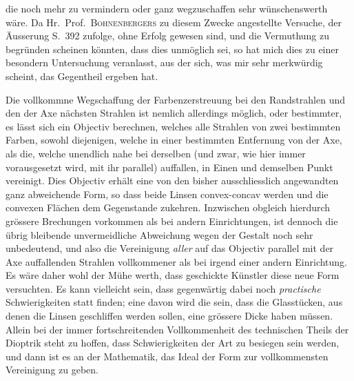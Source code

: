 die noch mehr zu vermindern oder ganz wegzuschaffen sehr wünschenswerth wäre. Da Hr.\ Prof.\ \textsc{Bohnenbergers} zu diesem Zwecke angestellte Versuche, der Äusserung S.\ 392 zufolge, ohne Erfolg gewesen sind, und die Vermuthung zu begründen scheinen könnten, dass dies unmöglich sei, so hat mich dies zu einer besondern Untersuchung veranlasst, aus der sich, was mir sehr merkwürdig scheint, das Gegentheil ergeben hat.

Die vollkommne Wegschaffung der Farbenzerstreuung bei den Randstrahlen und den der Axe nächsten Strahlen ist nemlich allerdings möglich, oder bestimmter, es lässt sich ein Objectiv berechnen, welches alle Strahlen von zwei bestimmten Farben, sowohl diejenigen, welche in einer bestimmten Entfernung von der Axe, als die, welche unendlich nahe bei derselben (und zwar, wie hier immer vorausgesetzt wird, mit ihr parallel) auffallen, in Einen und demselben Punkt vereinigt. Dies Objectiv erhält eine von den bisher ausschliesslich angewandten ganz abweichende Form, so dass beide Linsen convex-concav werden und die convexen Flächen dem Gegenstande zukehren. Inzwischen obgleich hierdurch grössere Brechungen vorkommen als bei andern Einrichtungen, ist dennoch die übrig bleibende unvermeidliche Abweichung wegen der Gestalt noch sehr unbedeutend, und also die Vereinigung \textit{aller} auf das Objectiv parallel mit der Axe auffallenden Strahlen vollkommener als bei irgend einer andern Einrichtung. Es wäre daher wohl der Mühe werth, dass geschickte Künstler diese neue Form versuchten. Es kann vielleicht sein, dass gegenwärtig dabei noch \textit{practische} Schwierigkeiten statt finden; eine davon wird die sein, dass die Glasstücken, aus denen die Linsen geschliffen werden sollen, eine grössere Dicke haben müssen. Allein bei der immer fortschreitenden Vollkommenheit des technischen Theils der Dioptrik steht zu hoffen, dass Schwierigkeiten der Art zu besiegen sein werden, und dann ist es an der Mathematik, das Ideal der Form zur vollkommensten Vereinigung zu geben.

